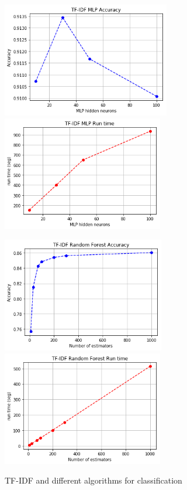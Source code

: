 \documentclass[oneside,onecolumn]{article}
\begin{document}
\begin{figure}[H]
	\includegraphics[height=5cm]{report_plot/plot_tfidf/mlp_accuracy.png}
	\includegraphics[height=5cm]{report_plot/plot_tfidf/mlp_runtime.png}
	
	\includegraphics[height=5cm]{report_plot/plot_tfidf/rf_accuracy.png}
	\includegraphics[height=5cm]{report_plot/plot_tfidf/rf_runtime.png}
	
	
	
	\caption{TF-IDF and different algorithms for classification} 
	\label{fig:lowmutation}
\end{figure}
\end{document}
